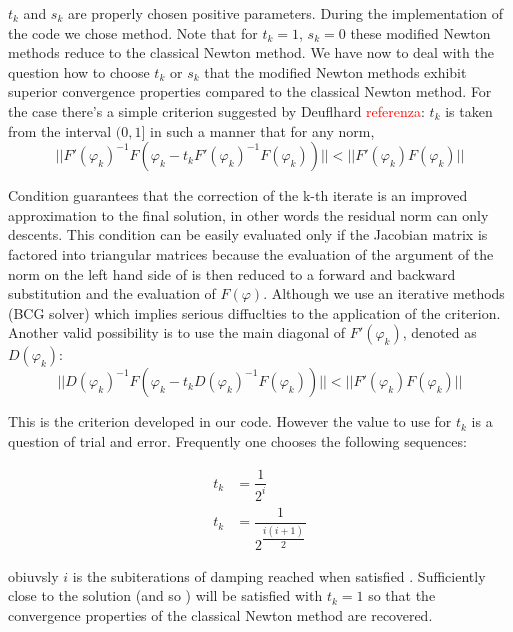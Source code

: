 $t_k$ and $s_k$ are properly chosen positive parameters. During the implementation of the code we chose  method. Note that for $t_k=1$, $s_k=0$ these modified Newton methods reduce to the classical Newton method. We have now to deal with the question how to choose $t_k$ or $s_k$ that the modified Newton methods exhibit superior convergence properties compared to the classical Newton method.
For the case  there's a simple criterion suggested by Deuflhard \textcolor{red}{referenza}: $t_k$ is taken from the interval $(0,1]$ in such a manner that for any norm,
\begin{equation}
\label{eq: extended criterion}
||F'(\varphi_k)^{-1}F(\varphi_k-t_kF'(\varphi_k)^{-1}F(\varphi_k))||<||F'(\varphi_k)F(\varphi_k)||
\end{equation}

Condition  guarantees that the correction of the k-th iterate is an improved approximation to the final solution, in other words the residual norm can only descents.
This condition can be easily evaluated only if the Jacobian matrix is factored into triangular matrices because the evaluation of the argument of the norm on the left hand side of  is then reduced to a forward and backward substitution and the evaluation of $F(\varphi)$. Although we use an iterative methods (BCG solver) which implies serious diffuclties to the application of the criterion. Another valid possibility is to use the main diagonal of $F'(\varphi_k)$, denoted as $D(\varphi_k)$:
\begin{equation}
\label{eq: easy criterion}
||D(\varphi_k)^{-1}F(\varphi_k-t_kD(\varphi_k)^{-1}F(\varphi_k))||<||F'(\varphi_k)F(\varphi_k)||
\end{equation}

This is the criterion developed in our code. However the value to use for $t_k$ is a question of trial and error. Frequently one chooses the following sequences:

\begin{align}
t_k & = \dfrac{1}{2^i} \\
t_k & = \dfrac{1}{2^{\dfrac{i(i+1)}{2}}}  
\end{align}

obiuvsly $i$ is the subiterations of damping reached when satisfied . Sufficiently close to the solution  (and so ) will be satisfied with $t_k=1$ so that the convergence properties of the classical Newton method are recovered.
 